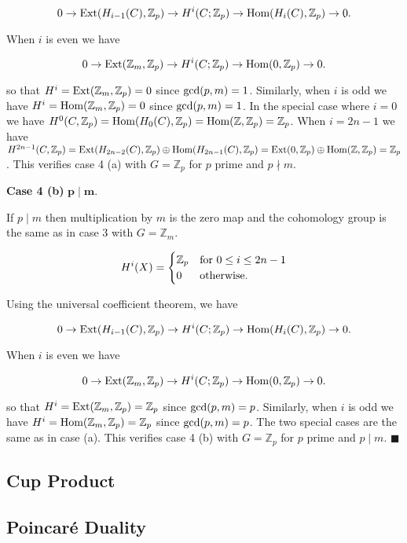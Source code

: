 \documentclass{article}
\newcommand{\Z}{\mathbb{Z}}
\newcommand{\Hom}{\textnormal{Hom}}
\newcommand{\Ext}{\textnormal{Ext}}
\begin{document}
$$0\to \Ext(H_{i-1}(C), \Z_{p})\to H^{i}(C;\Z_{p})\to \Hom(H_{i}(C),\Z_{p})\to 0.$$

When $i$ is even we have

$$0\to \Ext(\Z_{m}, \Z_{p})\to H^{i}(C;\Z_{p})\to \Hom(0,\Z_{p})\to 0.$$

so that $H^{i} = \Ext(\Z_{m},\Z_{p}) = 0$ since $\textnormal{gcd}(p, m) = 1$. Similarly, when $i$ is odd we have $H^{i} = \Hom(\Z_{m},\Z_{p}) = 0$ since $\textnormal{gcd}(p, m) = 1$. In the special case where $i = 0$ we have $H^{0}(C, \Z_{p}) = \Hom(H_{0}(C), \Z_{p}) = \Hom(\Z, \Z_{p}) = \Z_{p}$. When $i = 2n-1$ we have $H^{2n-1}(C, \Z_{p}) = \Ext(H_{2n-2}(C), \Z_{p})\oplus\Hom(H_{2n-1}(C), \Z_{p}) = \Ext(0, \Z_{p})\oplus\Hom(\Z, \Z_{p}) = \Z_{p}$. This verifies case 4 (a) with $G = \Z_{p}$ for $p$ prime and $p\nmid m$.
\medskip

\textbf{Case 4 (b)} $\mathbf{p\mid m}$.

If $p\mid m$ then multiplication by $m$ is the zero map and the cohomology group is the same as in case 3 with $G = \Z_{m}$.

\[H^{i}(X) = \begin{cases} \Z_{p} & \textnormal{for } 0\leq i\leq 2n-1\\
0 & \textnormal{otherwise}. \end{cases}\]
\medskip

Using the universal coefficient theorem, we have

$$0\to \Ext(H_{i-1}(C), \Z_{p})\to H^{i}(C;\Z_{p})\to \Hom(H_{i}(C),\Z_{p})\to 0.$$

When $i$ is even we have

$$0\to \Ext(\Z_{m}, \Z_{p})\to H^{i}(C;\Z_{p})\to \Hom(0,\Z_{p})\to 0.$$

so that $H^{i} = \Ext(\Z_{m},\Z_{p}) = \Z_{p}$ since $\textnormal{gcd}(p, m) = p$. Similarly, when $i$ is odd we have $H^{i} = \Hom(\Z_{m},\Z_{p}) = \Z_{p}$ since $\textnormal{gcd}(p, m) = p$. The two special cases are the same as in case (a). This verifies case 4 (b) with $G = \Z_{p}$ for $p$ prime and $p\mid m$. $\blacksquare$
\bigskip
\bigskip

\subsection{Cup Product}

\subsection{Poincaré Duality}
\end{document}
